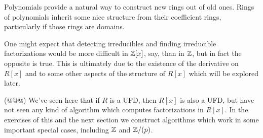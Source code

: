 Polynomials provide a natural way to construct new rings out of old ones.
Rings of polynomials inherit some nice structure from their coefficient rings, particularly if those rings are domains.
\begin{center}
\end{center}
One might expect that detecting irreducibles and finding irreducible factorizations would be more difficult in \(\mathbb{Z}[x]\), say, than in \(\mathbb{Z}\), but in fact the opposite is true.
This is ultimately due to the existence of the derivative on \(R[x]\) and to some other aspects of the structure of \(R[x]\) which will be explored later.

(@@@) We've seen here that if \(R\) is a UFD, then \(R[x]\) is also a UFD, but have not seen any kind of algorithm which computes factorizations in \(R[x]\).
In the exercises of this and the next section we construct algorithms which work in some important special cases, including \(\mathbb{Z}\) and \(\mathbb{Z}/(p)\).
